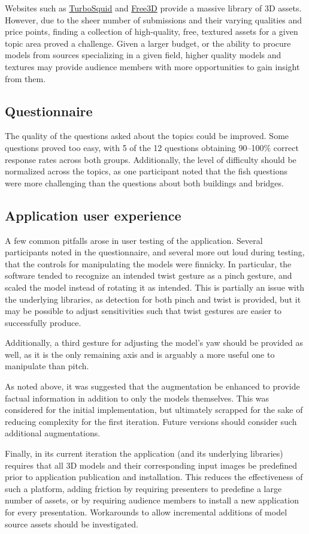 \documentclass[10pt,journal]{IEEEtran}
\begin{document}
Websites such as \href{https://www.turbosquid.com/}{TurboSquid} and
\href{https://free3d.com/}{Free3D} provide a massive library of 3D assets.
However, due to the sheer number of submissions and their varying qualities and
price points, finding a collection of high-quality, free, textured assets for a
given topic area proved a challenge. Given a larger budget, or the ability to
procure models from sources specializing in a given field, higher quality
models and textures may provide audience members with more opportunities to
gain insight from them.

\subsection{Questionnaire}

The quality of the questions asked about the topics could be improved. Some
questions proved too easy, with 5 of the 12 questions obtaining 90--100\%
correct response rates across both groups. Additionally, the level of
difficulty should be normalized across the topics, as one participant noted
that the fish questions were more challenging than the questions about both
buildings and bridges.

\subsection{Application user experience}

A few common pitfalls arose in user testing of the application. Several
participants noted in the questionnaire, and several more out loud during
testing, that the controls for manipulating the models were finnicky. In
particular, the software tended to recognize an intended twist gesture as a
pinch gesture, and scaled the model instead of rotating it as intended. This is
partially an issue with the underlying libraries, as detection for both pinch
and twist is provided, but it may be possible to adjust sensitivities such that
twist gestures are easier to successfully produce.

Additionally, a third gesture for adjusting the model's yaw should be provided
as well, as it is the only remaining axis and is arguably a more useful one to
manipulate than pitch.

As noted above, it was suggested that the augmentation be enhanced to provide
factual information in addition to only the models themselves. This was
considered for the initial implementation, but ultimately scrapped for the sake
of reducing complexity for the first iteration. Future versions should consider
such additional augmentations.

Finally, in its current iteration the application (and its underlying
libraries) requires that all 3D models and their corresponding input images be
predefined prior to application publication and installation. This reduces the
effectiveness of such a platform, adding friction by requiring presenters to
predefine a large number of assets, or by requiring audience members to install
a new application for every presentation. Workarounds to allow incremental
additions of model source assets should be investigated.



\end{document}
